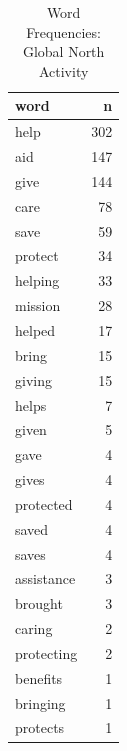 \begin{table}[ht]
\centering
\begin{tabular}{lr}
  \hline
word & n \\ 
  \hline
help & 302 \\ 
  aid & 147 \\ 
  give & 144 \\ 
  care &  78 \\ 
  save &  59 \\ 
  protect &  34 \\ 
  helping &  33 \\ 
  mission &  28 \\ 
  helped &  17 \\ 
  bring &  15 \\ 
  giving &  15 \\ 
  helps &   7 \\ 
  given &   5 \\ 
  gave &   4 \\ 
  gives &   4 \\ 
  protected &   4 \\ 
  saved &   4 \\ 
  saves &   4 \\ 
  assistance &   3 \\ 
  brought &   3 \\ 
  caring &   2 \\ 
  protecting &   2 \\ 
  benefits &   1 \\ 
  bringing &   1 \\ 
  protects &   1 \\ 
   \hline
\end{tabular}
\caption{Word Frequencies: Global North Activity} 
\end{table}
